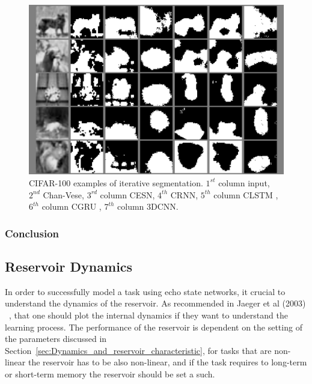 \documentclass{WitsPhysicsReport}
\begin{document}
\begin{figure}[H]
\centering
  \includegraphics[width=1\linewidth]{Figure/Results/CIFAR_100_sample.png}
 \caption{CIFAR-100 examples of iterative segmentation. $1^{st}$ column input, $2^{nd}$ Chan-Vese, $3^{rd}$ column CESN, $4^{th}$ CRNN, $5^{th}$ column CLSTM , $6^{th}$ column CGRU , $7^{th}$ column 3DCNN.}
 \label{fig:sample_results_cifar100}
\end{figure}



\subsubsection{Conclusion}
 

\subsection{Reservoir Dynamics}
In order to successfully model a task using echo state networks, it crucial to understand the dynamics of the reservoir. As recommended in Jaeger et al (2003) ~\citep{jaeger2002tutorial}, that one should plot the internal dynamics if they want to understand the learning process. The performance of the reservoir is dependent on the setting of the parameters discussed in Section~\ref{sec:Dynamics_and_reservoir_characteristic}, for tasks that are non-linear the reservoir has to be also non-linear, and if the task requires to long-term or short-term memory the reservoir should be set a such. 
\end{document}
